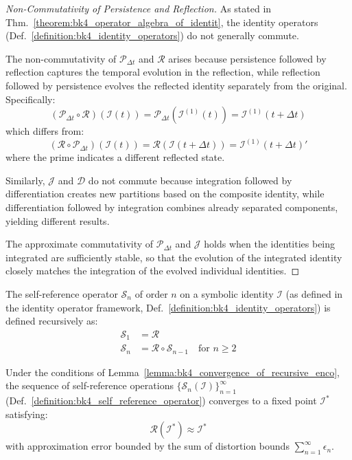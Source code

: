 \begin{proof}[Non-Commutativity of Persistence and Reflection]
\label{proof:bk4_persistence_reflection_noncommutativity}
As stated in Thm.~\ref{theorem:bk4_operator_algebra_of_identit}, the identity operators
(Def.~\ref{definition:bk4_identity_operators}) do not generally commute.

The non-commutativity of $\mathcal{P}_{\Delta t}$ and $\mathcal{R}$ arises because persistence followed by reflection captures the temporal evolution in the reflection, while reflection followed by persistence evolves the reflected identity separately from the original. Specifically:
\begin{equation}
    (\mathcal{P}_{\Delta t} \circ \mathcal{R})(\mathcal{I}(t)) = \mathcal{P}_{\Delta t}(\mathcal{I}^{(1)}(t)) = \mathcal{I}^{(1)}(t + \Delta t)
\end{equation}
which differs from:
\begin{equation}
    (\mathcal{R} \circ \mathcal{P}_{\Delta t})(\mathcal{I}(t)) = \mathcal{R}(\mathcal{I}(t + \Delta t)) = \mathcal{I}^{(1)}(t + \Delta t)'
\end{equation}
where the prime indicates a different reflected state.

Similarly, $\mathcal{J}$ and $\mathcal{D}$ do not commute because integration followed by differentiation creates new partitions based on the composite identity, while differentiation followed by integration combines already separated components, yielding different results.

The approximate commutativity of $\mathcal{P}_{\Delta t}$ and $\mathcal{J}$ holds when the identities being integrated are sufficiently stable, so that the evolution of the integrated identity closely matches the integration of the evolved individual identities.
\end{proof}
\begin{definition}
\label{definition:bk4_self_reference_operator}
The self-reference operator $\mathcal{S}_n$ of order $n$ on a symbolic identity $\mathcal{I}$ (as defined in the identity operator framework, Def.~\ref{definition:bk4_identity_operators}) is defined recursively as:
\begin{align}
    \mathcal{S}_1 &= \mathcal{R} \\
    \mathcal{S}_n &= \mathcal{R} \circ \mathcal{S}_{n-1} \quad \text{for } n \geq 2
\end{align}
\end{definition}
\begin{theorem}
\label{theorem:bk4_fixed_points_of_self_refere}
Under the conditions of Lemma~\ref{lemma:bk4_convergence_of_recursive_enco}, the sequence of self-reference operations $\{\mathcal{S}_n(\mathcal{I})\}_{n=1}^{\infty}$ (Def.~\ref{definition:bk4_self_reference_operator}) converges to a fixed point $\mathcal{I}^*$ satisfying:
\begin{equation}
    \mathcal{R}(\mathcal{I}^*) \approx \mathcal{I}^*
\end{equation}
with approximation error bounded by the sum of distortion bounds $\sum_{n=1}^{\infty} \epsilon_n$.
\end{theorem}
